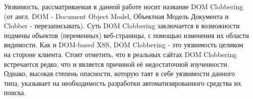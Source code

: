 Уязвимость, рассматриваемая в данной работе носит название DOM Clobbering (от англ. DOM - Document Object Model, Объектная Модель Документа и Clobber - перезаписывать). Суть DOM Clobbering заключается в возможности подмены объектов (переменных) веб-страницы, с помощью изменения их области видимости. Как и DOM-based XSS, DOM Clobbering - это уязвимость целиком на стороне клиента. Стоит отметить, что в реальных сайтах DOM Clobbering встречается редко, что и является причиной её недостаточной изученности. Однако, высокая степень опасности, которую таят в себе уязвимости данного типа, указывает на необходимость разработки автоматизированного средства их поиска.